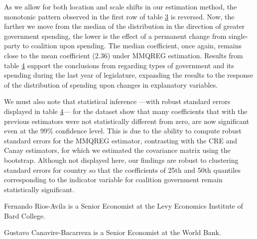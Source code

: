 \documentclass[bib]{statapress}
\begin{document}
\label{tab:mmqreg_results}{}

As we allow for both location and scale shifts in our estimation method,
the monotonic pattern observed in the first row of table
\hyperref[tab:mcanay_results]{3} is reversed. Now, the farther we move
from the median of the distribution in the direction of greater
government spending, the lower is the effect of a permanent change from
single-party to coalition upon spending. The median coefficient, once
again, remains close to the mean coefficient (2.36) under MMQREG
estimation. Results from table \hyperref[tab:mmqreg_results]{4} support
the conclusions from \citep{persson2007} regarding types of government
and its spending during the last year of legislature, expanding the
results to the response of the distribution of spending upon changes in
explanatory variables.

We must also note that statistical inference ---with robust standard
errors displayed in table \hyperref[tab:mmqreg_results]{4}--- for the
\citep{persson2007} dataset show that many coefficients that with the
previous estimators were not statistically different from zero, are now
significant even at the 99\% confidence level. This is due to the
ability to compute robust standard errors for the MMQREG estimator,
contrasting with the CRE and Canay estimators, for which we estimated
the covariance matrix using the bootstrap. Although not displayed here,
our findings are robust to clustering standard errors for country so
that the coefficients of 25th and 50th quantiles corresponding to the
indicator variable for coalition government remain statistically
significant.

\clearpage





\begin{aboutauthors}

Fernando Rios-Avila is a Senior Economist at the Levy Economics
Institute of Bard College.

Gustavo Canavire-Bacarreza is a Senior Economist at the World Bank.

\end{aboutauthors}
\end{document}
